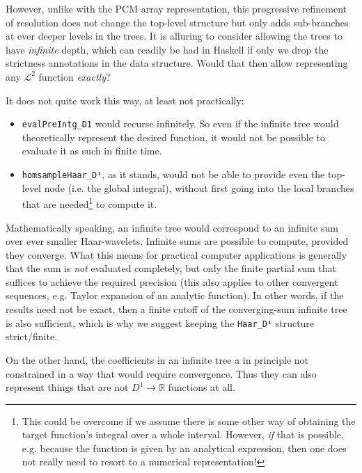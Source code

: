 \documentclass[final,sigplan]{acmart}\settopmatter{printfolios=true,printccs=false,printacmref=false}
\theoremstyle{acmplain}
\theoremstyle{acmdefinition}
\begin{document}
However, unlike with the PCM array representation, this progressive refinement of resolution does not change the top-level structure but only adds sub-branches at ever deeper levels in the trees. It is alluring to consider allowing the trees to have \emph{infinite} depth, which can readily be had in Haskell if only we drop the strictness annotations in the data structure. Would that then allow representing any $\mathcal{L}^2$ function \emph{exactly}?

It does not quite work this way, at least not practically:
\begin{itemize}
 \item \verb`evalPreIntg_D1` would recurse infinitely. So even if the infinite tree would theoretically represent the desired function, it would not be possible to evaluate it as such in finite time.
 \item \verb`homsampleHaar_D¹`, as it stands, would not be able to provide even the top-level node (i.e. the global integral), without first going into the local branches that are needed\footnote{
This could be overcome if we assume there is some other way of obtaining the target function's integral over a whole interval. However, \emph{if} that is possible, e.g. because the function is given by an analytical expression, then one does not really need to resort to a numerical representation!} to compute it.
\end{itemize}
Mathematically speaking, an infinite tree would correspond to an infinite sum over ever smaller Haar-wavelets. Infinite sums are possible to compute, provided they converge. What this means for practical computer applications is generally that the sum is \emph{not} evaluated completely, but only the finite partial sum that suffices to achieve the required precision (this also applies to other convergent sequences, e.g. Taylor expansion of an analytic function).
In other words, if the results need not be exact, then a finite cutoff of the converging-sum infinite tree is also sufficient, which is why we suggest keeping the \verb`Haar_D¹` structure strict/finite.

On the other hand, the coefficients in an infinite tree a in principle not constrained in a way that would require convergence. Thus they can also represent things that are not $D^1\to \mathbb{R}$ functions at all.
\end{document}
